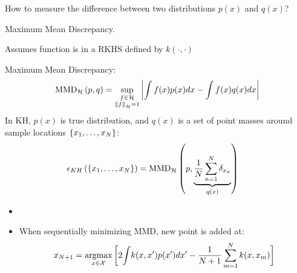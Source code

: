 \documentclass[usenames,dvipsnames]{beamer}
\begin{document}
\begin{frame}[plain, t]
	\titlebodyskip
	

	\slidebody
	{
		How to measure the difference between two distributions $p(x)$ and $q(x)$?
		
		Maximum Mean Discrepancy.
		
		Assumes function is in a RKHS defined by $k(\cdot , \cdot)$		
		
		Maximum Mean Discrepancy:
		\begin{align*}
			{\rm MMD}_{\mathcal{H}}\left(p,q\right) = \sup_{\substack{f\in\mathcal{H}\\\left\|f\right\|_{\mathcal{H}}=1}}\left\vert\int f(x) p(x) dx - \int f(x) q(x) dx \right\vert
		\end{align*}
		\pause
		In KH, $p(x)$ is true distribution, and $q(x)$ is a set of point masses around sample locations $\{{x}_1,\ldots,{x}_{N}\}$:
		\begin{align*}
			\epsilon_{KH}&\left(\{{x}_1,\ldots,{x}_{N}\}\right) = 
			{\rm MMD}_{\mathcal{H}}\left(p, \underbrace{\frac{1}{N}\sum_{n=1}^{N}\delta_{x_n}}_{q(x)}\right)
		\end{align*}
	}
\end{frame}



\begin{frame}[plain, t]
	\titlebodyskip
	\slidebody
	{
	\begin{itemize}
\item 		

\pause

\item When sequentially minimizing MMD, new point is added at:
\begin{align*}
x_{N+1} = \argmax_{\vx \in \mathcal{X}} \bigg[ 2 \! \int \! k(\vx, \vx') p(x') dx' \nonumber - \frac{1}{N+1}\sum_{m=1}^{N} k(\vx,\vx_m) \bigg]\\
\end{align*}
\end{itemize}
	}
\end{frame}
\end{document}
